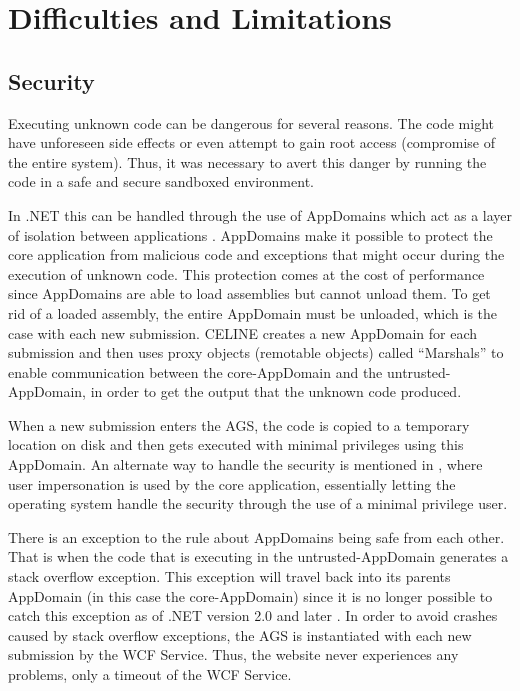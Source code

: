 \section{Difficulties and Limitations}

\subsection{Security} \label{subsec:security}
Executing unknown code can be dangerous for several reasons. The code might have unforeseen side effects or even attempt to gain root access (compromise of the entire system). Thus, it was necessary to avert this danger by running the code in a safe and secure sandboxed environment.

In .NET this can be handled through the use of AppDomains which act as a layer of isolation between applications \cite{ApplicationDomains}. AppDomains make it possible to protect the core application from malicious code and exceptions that might occur during the execution of unknown code. This protection comes at the cost of performance since AppDomains are able to load assemblies but cannot unload them. To get rid of a loaded assembly, the entire AppDomain must be unloaded, which is the case with each new submission. CELINE creates a new AppDomain for each submission and then uses proxy objects (remotable objects) called ``Marshals'' \cite{Marshals} to enable communication between the core-AppDomain and the untrusted-AppDomain, in order to get the output that the unknown code produced.

When a new submission enters the AGS, the code is copied to a temporary location on disk and then gets executed with minimal privileges using this AppDomain. An alternate way to handle the security is mentioned in \cite{Suleman}, where user impersonation is used by the core application, essentially letting the operating system handle the security through the use of a minimal privilege user.

There is an exception to the rule about AppDomains being safe from each other. That is when the code that is executing in the untrusted-AppDomain generates a stack overflow exception. This exception will travel back into its parents AppDomain (in this case the core-AppDomain) since it is no longer possible to catch this exception as of .NET version 2.0 and later \cite{StackOverflowException}. In order to avoid crashes caused by stack overflow exceptions, the AGS is instantiated with each new submission by the WCF Service. Thus, the website never experiences any problems, only a timeout of the WCF Service.


